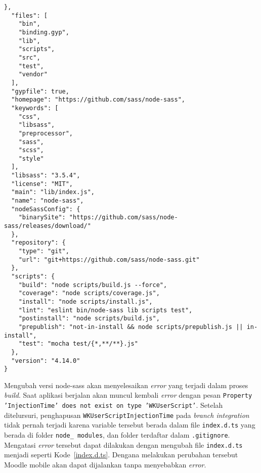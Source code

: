 \begin{lstlisting}[frame=single, label ={node:sass version}, caption = Perubahan versi node-sass pada \texttt{package-lock.json} ]
  },
  "files": [
    "bin",
    "binding.gyp",
    "lib",
    "scripts",
    "src",
    "test",
    "vendor"
  ],
  "gypfile": true,
  "homepage": "https://github.com/sass/node-sass",
  "keywords": [
    "css",
    "libsass",
    "preprocessor",
    "sass",
    "scss",
    "style"
  ],
  "libsass": "3.5.4",
  "license": "MIT",
  "main": "lib/index.js",
  "name": "node-sass",
  "nodeSassConfig": {
    "binarySite": "https://github.com/sass/node-sass/releases/download/"
  },
  "repository": {
    "type": "git",
    "url": "git+https://github.com/sass/node-sass.git"
  },
  "scripts": {
    "build": "node scripts/build.js --force",
    "coverage": "node scripts/coverage.js",
    "install": "node scripts/install.js",
    "lint": "eslint bin/node-sass lib scripts test",
    "postinstall": "node scripts/build.js",
    "prepublish": "not-in-install && node scripts/prepublish.js || in-install",
    "test": "mocha test/{*,**/**}.js"
  },
  "version": "4.14.0"
}

\end{lstlisting}

Mengubah versi node-sass akan menyelesaikan \textit{error} yang terjadi dalam proses \textit{build}. Saat aplikasi berjalan akan muncul kembali \textit{error} dengan pesan \texttt{Property 'InjectionTime' does not exist on type 'WKUserScript'}. Setelah ditelursuri, penghapusan \texttt{WKUserScriptInjectionTime} pada \textit{branch integration} tidak pernah terjadi karena variable tersebut berada dalam file \texttt{index.d.ts} yang berada di folder \texttt{node\_ modules}, dan folder terdaftar dalam \texttt{.gitignore}. Mengatasi \textit{error} tersebut dapat dilakukan dengan mengubah file \texttt{index.d.ts} menjadi seperti \mbox{Kode \ref{index.d.ts}}. Dengana melakukan perubahan tersebut Moodle mobile akan dapat dijalankan tanpa menyebabkan \textit{error}.


